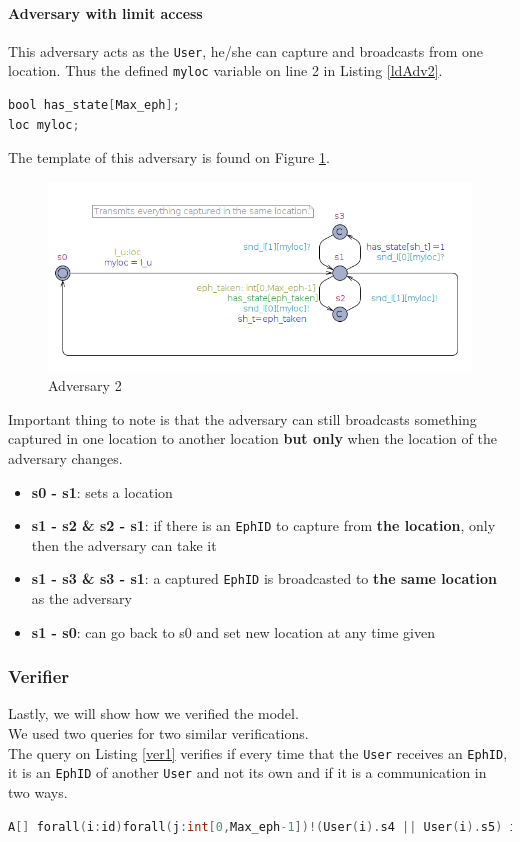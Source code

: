 \documentclass[a4paper, twocolumn]{article}
\begin{document}
\paragraph{Adversary with limit access}
This adversary acts as the \texttt{User}, he/she can capture and broadcasts from one location. Thus the defined \texttt{myloc} variable on line 2 in Listing \ref{ldAdv2}.
\begin{lstlisting}[language=C, caption= Adv2 Declarations,label={ldAdv2},xleftmargin=.02\textwidth]
bool has_state[Max_eph];
loc myloc;
\end{lstlisting}
The template of this adversary is found on Figure \ref{fig:adv2}.
\begin{figure}[H]
    \centering
    \includegraphics[scale=0.33]{images/adv2.png}
    \caption{Adversary 2}
    \label{fig:adv2} 
\end{figure}
\noindent Important thing to note is that the adversary can still broadcasts something captured in one location to another location \textbf{but only} when the location of the adversary changes.
\begin{itemize}
    \item \textbf{s0 - s1}: sets a location
    \item \textbf{s1 - s2 \& s2 - s1}: if there is an \texttt{EphID} to capture from \textbf{the location}, only then the adversary can take it
    \item \textbf{s1 - s3 \& s3 - s1}: a captured \texttt{EphID} is broadcasted to \textbf{the same location} as the adversary
    \item \textbf{s1 - s0}: can go back to s0 and set new location at any time given
\end{itemize}

\subsubsection{Verifier}\label{querry}
Lastly, we will show how we verified the model.\\
We used two queries for two similar verifications.\\
The query on Listing \ref{ver1} verifies if every time that the \texttt{User} receives an \texttt{EphID}, it is an \texttt{EphID} of another \texttt{User} and not its own and if it is a communication in two ways.
\begin{lstlisting}[language=C, caption= Weak Verifier,label={ver1}]
A[] forall(i:id)forall(j:int[0,Max_eph-1])!(User(i).s4 || User(i).s5) imply (User(i).r_token[j] imply exists(k:int[0,numEph-1])User(j/numEph+1).r_token[(i-1)*numEph+k])
\end{lstlisting}
\end{document}
